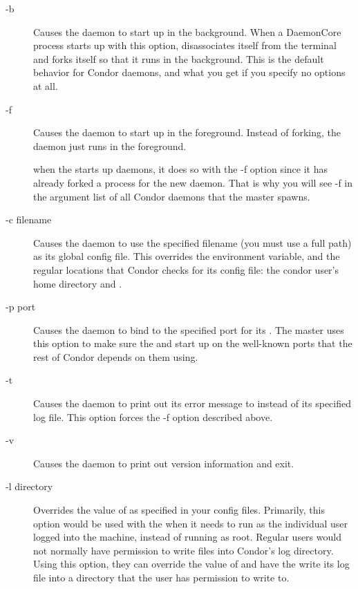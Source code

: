 \begin{description}

\item[-b] Causes the daemon to start up in the background.  When a
  DaemonCore process starts up with this option, disassociates itself
  from the terminal and forks itself so that it runs in the
  background.  This is the default behavior for Condor daemons, and
  what you get if you specify no options at all.

\item[-f] Causes the daemon to start up in the foreground.  Instead of
  forking, the daemon just runs in the foreground.  

  \Note when the  starts up daemons, it does
  so with the -f option since it has already forked a process for the
  new daemon.  That is why you will see -f in the argument list of all
  Condor daemons that the master spawns.

\item[-c filename] Causes the daemon to use the specified filename
  (you must use a full path) as its global config file.  This
  overrides the  environment variable, and the
  regular locations that Condor checks for its config file: the condor
  user's home directory and .  

\item[-p port] Causes the daemon to bind to the specified port for its
  .  The master uses this option to make sure the
   and  start up on the
  well-known ports that the rest of Condor depends on them using.

\item[-t] Causes the daemon to print out its error message to
   instead of its specified log file.  This option forces
  the -f option described above.

\item[-v] Causes the daemon to print out version information and
  exit.

\item[-l directory] Overrides the value of  as specified in
  your config files.  Primarily, this option would be used with the
   when it needs to run as the individual user logged
  into the machine, instead of running as root.  Regular users would
  not normally have permission to write files into Condor's log
  directory.  Using this option, they can override the value of
   and have the  write its log file into a
  directory that the user has permission to write to.


\end{description}
